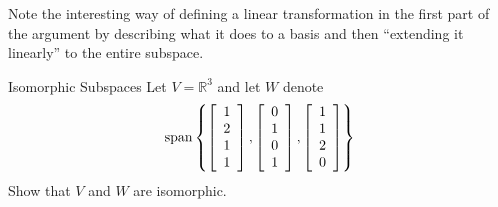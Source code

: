 Note the interesting way of defining a linear transformation in the first
part of the argument by describing what it does to a basis and then
``extending it linearly'' to the entire subspace.

\begin{example}{Isomorphic Subspaces}{}
Let $V=\mathbb{R}^{3}$ and let $W$ denote 
\begin{equation*}
\mbox{span}\left\{ \left[ 
\begin{array}{r}
1 \\ 
2 \\ 
1 \\ 
1
\end{array}
\right] ,\left[ 
\begin{array}{r}
0 \\ 
1 \\ 
0 \\ 
1
\end{array}
\right] ,\left[ 
\begin{array}{r}
1 \\ 
1 \\ 
2 \\ 
0
\end{array}
\right] \right\}
\end{equation*}
Show that $V$ and $W$ are isomorphic. 
\end{example}

